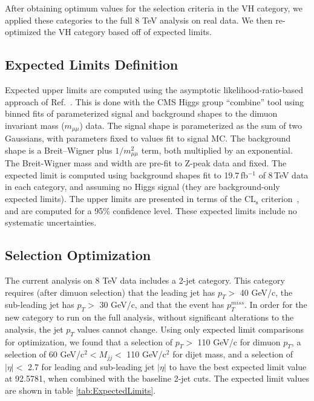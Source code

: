 \documentclass[12pt]{article}
\begin{document}
After obtaining optimum values for the selection criteria in the VH category, we applied these categories to the full 8 TeV analysis on real data. 
We then re-optimized the VH category based off of expected limits. 

\subsection{Expected Limits Definition}

Expected upper limits are computed using the asymptotic likelihood-ratio-based approach of 
Ref.~\cite{stats}.  This is done with the CMS Higgs group ``combine'' tool using binned
fits of parameterized signal and background shapes to the dimuon invariant mass 
($m_{\mu\mu}$) data.  The signal shape is parameterized
as the sum of two Gaussians, with parameters fixed to values fit to signal MC.
The background shape is a Breit--Wigner plus $1/m_{\mu\mu}^2$ term, both multiplied
by an exponential.  The Breit-Wigner mass and width are pre-fit to Z-peak data and fixed.
The expected limit is computed
using background shapes fit to 19.7\,fb$^{-1}$ of 8\,TeV data in each category,
and assuming no Higgs signal (they are background-only expected limits).  The upper
limits are presented in terms of the $\mathrm{CL_s}$ criterion~\cite{cls}, and are computed for 
a 95\% confidence level.  These expected limits include no systematic uncertainties.

\subsection{Selection Optimization}

The current analysis on 8 TeV data includes a 2-jet category. This category requires (after dimuon selection) 
that the leading jet has $p_{T} >$ 40 GeV/c, the sub-leading jet has $p_{T} >$ 30 GeV/c, and that the event has $p_{T}^{miss}$. 
In order for the new category to run
on the full analysis, without significant alterations to the analysis, the jet $p_{T}$ values cannot change. Using only expected limit comparisons for 
optimization, we found that a selection of $p_{T}>$ 110 GeV/c for dimuon $p_{T}$, 
a selection of 60 GeV/c$^{2}< M_{jj}<$ 110 GeV/c$^{2}$ for dijet mass, and a selection of $|\eta|<$ 2.7 for leading and sub-leading 
jet $|\eta|$ to have the best expected limit value at 92.5781, when combined with the baseline 2-jet cuts. 
The expected limit values are shown in table \ref{tab:ExpectedLimits}.
\end{document}
